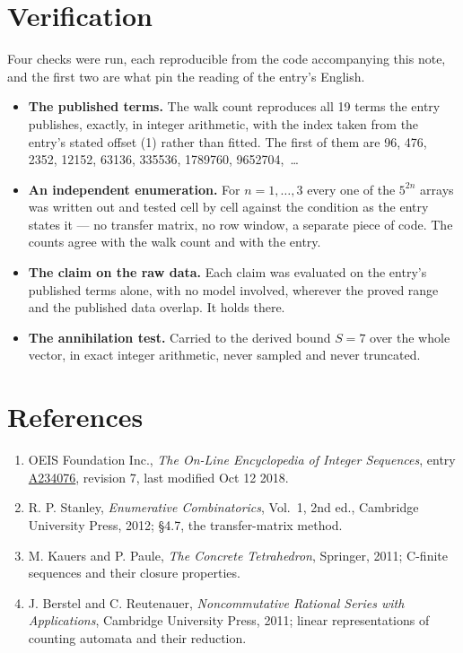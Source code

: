 \documentclass[11pt]{article}
\theoremstyle{definition}
\begin{document}
\section{Verification}

Four checks were run, each reproducible from the code accompanying this note, and the first two are what pin the reading of the entry's English.

\begin{itemize}

\item {\bfseries The published terms.} The walk count reproduces all 19 terms the entry publishes, exactly, in integer arithmetic, with the index taken from the entry's stated offset (1) rather than fitted. The first of them are 96, 476, 2352, 12152, 63136, 335536, 1789760, 9652704,~\dots

\item {\bfseries An independent enumeration.} For $n = 1,\dots,3$ every one of the $5^{2n}$ arrays was written out and tested cell by cell against the condition as the entry states it --- no transfer matrix, no row window, a separate piece of code. The counts agree with the walk count and with the entry.

\item {\bfseries The claim on the raw data.} Each claim was evaluated on the entry's published terms alone, with no model involved, wherever the proved range and the published data overlap. It holds there.

\item {\bfseries The annihilation test.} Carried to the derived bound $S = 7$ over the whole vector, in exact integer arithmetic, never sampled and never truncated.

\end{itemize}

\section{References}

\begin{enumerate}

\item OEIS Foundation Inc., \emph{The On-Line Encyclopedia of Integer Sequences}, entry \href{https://oeis.org/A234076}{A234076}, revision 7, last modified Oct 12 2018.

\item R. P. Stanley, \emph{Enumerative Combinatorics}, Vol.~1, 2nd ed., Cambridge University Press, 2012; \S4.7, the transfer-matrix method.

\item M. Kauers and P. Paule, \emph{The Concrete Tetrahedron}, Springer, 2011; C-finite sequences and their closure properties.

\item J. Berstel and C. Reutenauer, \emph{Noncommutative Rational Series with Applications}, Cambridge University Press, 2011; linear representations of counting automata and their reduction.

\end{enumerate}
\end{document}
